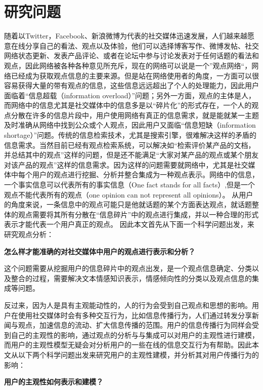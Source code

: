\section{研究问题}
\label{point}
随着以Twitter，Facebook、新浪微博为代表的社交媒体迅速发展，人们越来越愿意在线分享自己的看法、观点以及体验，他们可以选择博客写作、微博发帖、社交网络状态更新、发表产品评论、或者在论坛中参与讨论发表对于任何话题的看法和观点，因此网络被各种各种意见所充斥，现在的网络可以说是一个”观点网络“，网络已经成为获取观点信息的主要来源。但是站在网络使用者的角度，一方面可以很容易获得大量的带有观点的信息，这些信息远远超出了个人的处理能力，因此用户面临着“信息超载（information overload）”问题；另外一方面，观点的主体是人，而网络中的信息尤其是社交媒体中的信息多是以“碎片化”的形式存在，一个人的观点分散在许多的信息片段中，用户使用网络有真正的信息需求，就是能就某一主题及时准确从网络中找到公众或个人观点，因此用户又面临“信息短缺（information shortage）”问题。传统的信息检索技术，尤其是搜索引擎，很难解决这样的矛盾的信息需求。当然目前已经有观点检索系统，可以解决如“检索评价某产品的文档，并总结其中的观点”这样的问题，但是还不能满足“大家对某产品的观点或某个朋友对该产品的观点”这样的信息需求。因为这样的问题需要就网络中，尤其是社交媒体中每个用户的观点进行挖掘、分析并整合集成为一种观点表示。网络中的信息，一个事实信息可以代表所有的事实信息（One fact stands for all facts）,但是一个观点不能代表所有的观点（one opinion can not represent all opinions）。
从用户的角度来说，一条信息中的观点可能只是他就话题的某个方面表达观点，就话题整体的观点需要将其所有分散在“信息碎片”中的观点进行集成，并以一种合理的形式表示才能代表一个用户真正的观点。
因此本文首先从下面一个科学问题出发，来研究观点分析：

\textbf{怎么样才能准确的对社交媒体中用户的观点进行表示和分析？}

这个问题需要从挖掘用户的信息碎片中的观点出发，是一个观点信息确定、分类以及整合的过程，需要解决文本情感知识表示，情感倾向性的分类以及观点信息的集成等问题。

反过来，因为人是具有主观能动性的，人的行为会受到自己观点和思想的影响。用户在使用社交媒体时会有多种交互行为，比如信息传播行为，人们通过转发分享新闻与观点，加速信息的流动、扩大信息传播的范围。用户的信息传播行为同样会受到自己的主观性的影响，通过观点的分析与与集成可以对用户的主观性进行建模，而用户的主观性模型无疑会对分析用户的一些在线的信息交互行为有帮助。因此本文从以下两个科学问题出发来研究用户的主观性建模，并分析其对用户传播行为的影响：

\textbf{用户的主观性如何表示和建模？}

